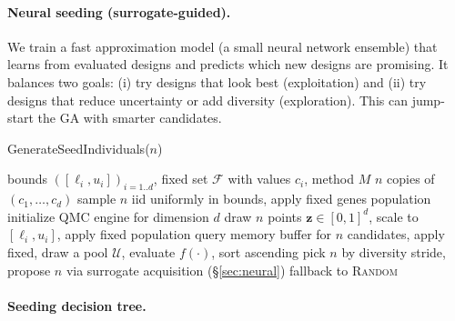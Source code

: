 \documentclass[12pt,a4paper]{article}
\begin{document}
\paragraph{Neural seeding (surrogate-guided).}
We train a fast approximation model (a small neural network ensemble) that learns from evaluated designs and predicts which new designs are promising. It balances two goals: (i) try designs that look best (exploitation) and (ii) try designs that reduce uncertainty or add diversity (exploration). This can jump-start the GA with smarter candidates.

\begin{algorithm}[H]
\caption{GenerateSeedIndividuals($n$)}
\begin{algorithmic}[1]
\Require bounds $([\ell_i,u_i])_{i=1..d}$, fixed set $\mathcal{F}$ with values $c_i$, method $M$
 \State \Return $n$ copies of $(c_1,\ldots,c_d)$ \EndIf
{} \State sample $n$ iid uniformly in bounds, apply fixed genes \State \Return population \EndIf
{}
\State initialize QMC engine for dimension $d$
\State draw $n$ points $\bm{z}\in[0,1]^d$, scale to $[\ell_i,u_i]$, apply fixed
\State \Return population
\State query memory buffer for $n$ candidates, apply fixed, \Return
{}
\State draw a pool $\mathcal{U}$, evaluate $f(\cdot)$, sort ascending
\State pick $n$ by diversity stride, \Return
{}
\State propose $n$ via surrogate acquisition (\S\ref{sec:neural})
\State \Return
\Else \State fallback to \textsc{Random}
\EndIf
\end{algorithmic}
\end{algorithm}

\paragraph{Seeding decision tree.}
\begin{center}
\end{center}
\end{document}
